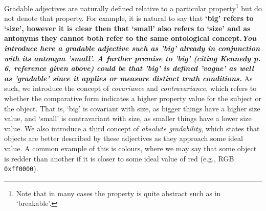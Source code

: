 \documentclass[11pt]{article}
\begin{document}
Gradable adjectives are naturally defined relative to a particular 
property\footnote{Note that in many cases the property is quite abstract such as in 
`breakable'.} but do not denote that property. For example, it is natural to say that \textbf{`big' refers to 
`size', however it is clear then that `small' also refers to `size' and as antonyms 
they cannot both refer to the same ontological concept.\textit{You introduce here a gradable adjective such as 'big' already in conjunction with its antonym 'small'. A further premise to 'big' (citing Kennedy p. 6, reference given above) could be that 'big' is defined 'vague' as well as 'gradable' since it applies or measure distinct truth conditions. }} As such, we introduce 
the concept of \emph{covariance} and \emph{contravariance}, which refers to 
whether the comparative form indicates a higher property value for the subject 
or the object. That is, `big' is covariant with size, as bigger things have 
a higher size value, and `small' is contravariant with size, as smaller things have 
a lower size value. We also introduce a third concept of \emph{absolute gradability}, 
which states that objects are better described by these adjectives as they approach some ideal value. 
A common example of this is colours, where we may say that some object is 
redder than another if it is closer to some ideal value of red (e.g., RGB {\tt 0xff0000}). 
\end{document}
